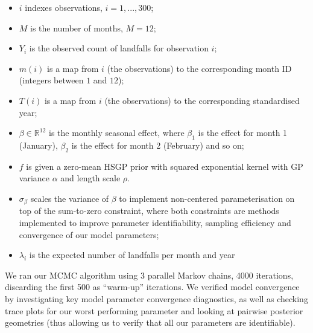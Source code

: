 \documentclass[
]{article}
\providecommand{\tightlist}{%
  \setlength{\itemsep}{0pt}\setlength{\parskip}{0pt}}
\begin{document}
\begin{itemize}
\tightlist
\item
  \(i\) indexes observations, \(i=1,...,300\);
\item
  \(M\) is the number of months, \(M = 12\);
\item
  \(Y_{i}\) is the observed count of landfalls for observation \(i\);
\item
  \(m(i)\) is a map from \(i\) (the observations) to the corresponding month ID (integers between \(1\) and \(12\));
\item
  \(T(i)\) is a map from \(i\) (the observations) to the corresponding standardised year;
\item
  \(\beta \in \mathbb{R}^{12}\) is the monthly seasonal effect, where \(\beta_1\) is the effect for month 1 (January), \(\beta_2\) is the effect for month 2 (February) and so on;
\item
  \(f\) is given a zero-mean HSGP prior with squared exponential kernel with GP variance \(\alpha\) and length scale \(\rho\).\\
\item
  \(\sigma_{\beta}\) scales the variance of \(\beta\) to implement non-centered parameterisation on top of the sum-to-zero constraint, where both constraints are methods implemented to improve parameter identifiability, sampling efficiency and convergence of our model parameters;
\item
  \(\lambda_{i}\) is the expected number of landfalls per month and year
\end{itemize}

We ran our MCMC algorithm using 3 parallel Markov chains, 4000 iterations, discarding the first 500 as ``warm-up'' iterations. We verified model convergence by investigating key model parameter convergence diagnostics, as well as checking trace plots for our worst performing parameter and looking at pairwise posterior geometries (thus allowing us to verify that all our parameters are identifiable).
\end{document}
